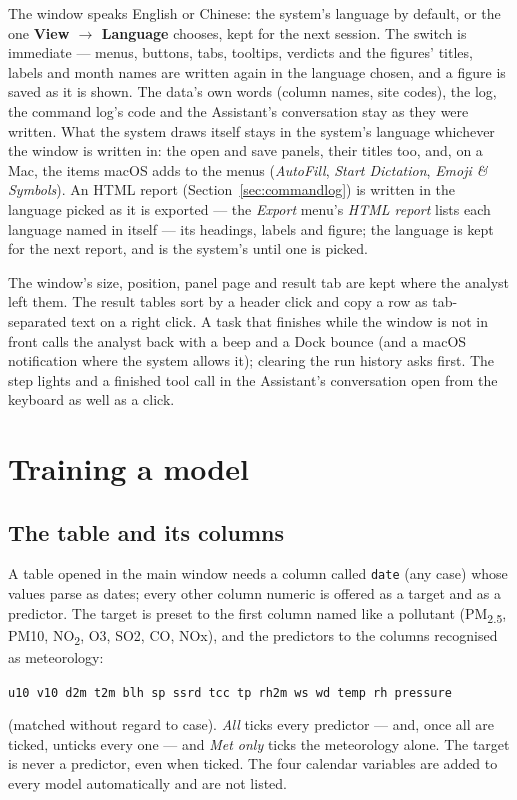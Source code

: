\documentclass[11pt]{report}
\newcommand{\codeunderscore}{\textunderscore\allowbreak}
\newcommand{\code}[1]{\texttt{\let\_\codeunderscore #1}}
\newcommand{\tab}[1]{\textbf{#1}}
\newcommand{\NOtwo}{NO\textsubscript{2}}
\newcommand{\PMtwo}{PM\textsubscript{2.5}}
\begin{document}
The window speaks English or Chinese: the system's language by default, or the one
\tab{View $\rightarrow$ Language} chooses, kept for the next session. The switch is
immediate --- menus, buttons, tabs, tooltips, verdicts and the figures' titles, labels and
month names are written again in the language chosen, and a figure is saved as it is
shown. The data's own words (column names, site codes), the log, the command log's code
and the Assistant's conversation stay as they were written. What the system draws
itself stays in the system's language whichever the window is written in: the
open and save panels, their titles too, and, on a Mac, the items macOS adds to the menus
(\emph{AutoFill}, \emph{Start Dictation}, \emph{Emoji \& Symbols}). An HTML
report (Section~\ref{sec:commandlog}) is written in the language picked as it is exported
--- the \emph{Export} menu's \emph{HTML report} lists
each language named in itself --- its headings, labels and figure; the language is kept
for the next report, and is the system's until one is picked.

The window's size, position, panel page and result tab are kept where the analyst left
them. The result tables sort by a header click and copy a row as tab-separated text on a
right click. A task that finishes while the window is not in front calls the analyst back
with a beep and a Dock bounce (and a macOS notification where the system allows it);
clearing the run history asks first. The step lights and a finished tool call in the
Assistant's conversation open from the keyboard as well as a click.

\chapter{Training a model}\label{ch:train}

\section{The table and its columns}\label{sec:columns}
A table opened in the main window needs a column called \code{date} (any case) whose
values parse as dates; every other column numeric is offered as a target and as a
predictor. The target is preset to the first column named like a pollutant (\PMtwo{},
PM10, \NOtwo{}, O3, SO2, CO, NOx), and the predictors to the columns recognised as
meteorology:
\begin{center}\small
\code{u10 v10 d2m t2m blh sp ssrd tcc tp rh2m ws wd temp rh pressure}
\end{center}
(matched without regard to case). \emph{All} ticks every predictor --- and, once all are
ticked, unticks every one --- and \emph{Met only} ticks the meteorology alone. The target is never a predictor, even when ticked. The four calendar
variables are added to every model automatically and are not listed.
\end{document}
